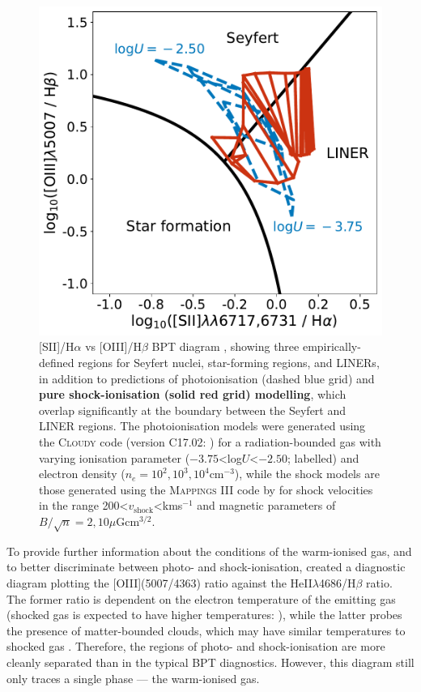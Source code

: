 \begin{figure}
    \centering
    \includegraphics[width=0.75\linewidth]{figures/introduction/bpt_diagram_photo_shock_ionisation.pdf}
    \caption[{[SII]/H$\alpha$ vs [OIII]/H$\beta$ BPT \citep{Baldwin1981, Kewley2006} diagram with shock and photoionisation modelling.}]{[SII]/H$\alpha$ vs [OIII]/H$\beta$ BPT diagram \citep{Baldwin1981}, showing three empirically-defined regions \citep{Kewley2006} for Seyfert nuclei, star-forming regions, and LINERs, in addition to predictions of photoionisation (dashed blue grid) and \textbf{pure shock-ionisation (solid red grid) modelling}, which overlap significantly at the boundary between the Seyfert and LINER regions. The photoionisation models were generated using the \textsc{Cloudy} code (version C17.02: \citealt{Ferland2017}) for a radiation-bounded gas with varying ionisation parameter ($-3.75$\;\textless\;log$U$\;\textless\;$-2.50$; labelled) and electron density ($n_e=10^2,10^3,10^4$\;cm$^{-3}$), while the shock models are those generated using the \textsc{Mappings III} code by \citet{Allen2008} for shock velocities in the range 200\;\textless\;$v_\mathrm{shock}$\;\textless{}\;km\;s$^{-1}$ and magnetic parameters of $B/\sqrt{n}=2,10$\;$\mu$G\;cm$^{3/2}$.}
    \label{fig: introduction: outflows: acceleration_mechanisms: bpt_diagram_photo_shock_ionisation}
\end{figure}

To provide further information about the conditions of the warm-ionised gas, and to better discriminate between photo- and shock-ionisation, \citet{VillarMartin1999} created a diagnostic diagram plotting the [OIII](5007/4363) ratio against the He\;II$\lambda$4686/H$\beta$ ratio. The former ratio is dependent on the electron temperature of the emitting gas (shocked gas is expected to have higher temperatures: \citealt{Fosbury1978}), while the latter probes the presence of matter-bounded clouds, which may have similar temperatures to shocked gas \citep{Binette1996}. Therefore, the regions of photo- and shock-ionisation are more cleanly separated than in the typical BPT diagnostics. However, this diagram still only traces a single phase --- the warm-ionised gas.

